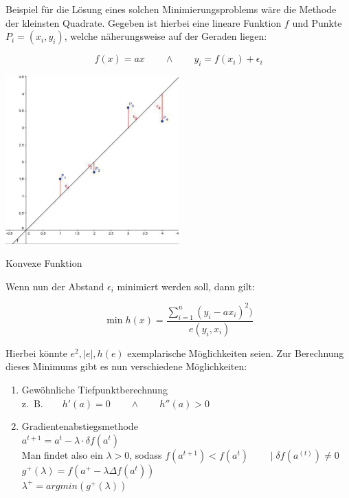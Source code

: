 \begin{Thm}
Beispiel für die Lösung eines solchen Minimierungsproblems wäre die Methode der kleinsten Quadrate. Gegeben ist hierbei eine lineare Funktion $f$ und Punkte $P_i=(x_i,y_i)$, welche näherungsweise auf der Geraden liegen:

\begin{equation*}
f(x)=ax \qquad\wedge\qquad y_i=f(x_i)+\epsilon_i
\end{equation*}

\begin{dsafigure}
\begin{center}
\includegraphics[width=0.5\textwidth]{Grafik-OptimierungLennart_LineareRegression.pdf}
\caption{Konvexe Funktion}
\label{figure:Grafik-OptimierungLennart_LineareRegression.pdf}
\end{center}
\end{dsafigure}

Wenn nun der Abstand $\epsilon_i$ minimiert werden soll, dann gilt:

\begin{equation*}
\min h(x)=\frac{\sum_{i=1}^n(y_i-ax_i)^2)}{e(y_i,x_i)}
\end{equation*}

Hierbei könnte $e^2,\mid e\mid, h(e)$ exemplarische Möglichkeiten seien. Zur Berechnung dieses Minimums gibt es nun verschiedene Möglichkeiten:

\begin{enumerate}
\item Gewöhnliche Tiefpunktberechnung \\
z.~B.$\qquad h'(a)=0\qquad \wedge\qquad h''(a)>0$
\item Gradientenabstiegsmethode \\
$a^{t+1}  =a^{t} - \lambda \cdot \delta f(a^{t})$ \\
Man findet also ein $\lambda > 0$, sodass
$f(a^{t+1}) < f(a^{t})  \qquad \mid \delta f(a^{(t)}) \neq 0$ \\
$g^{+}(\lambda)=f(a^+-\lambda\Delta f(a^t))$ \\
$\lambda^+=argmin(g^+(\lambda))$
\end{enumerate}

\end{Thm}

